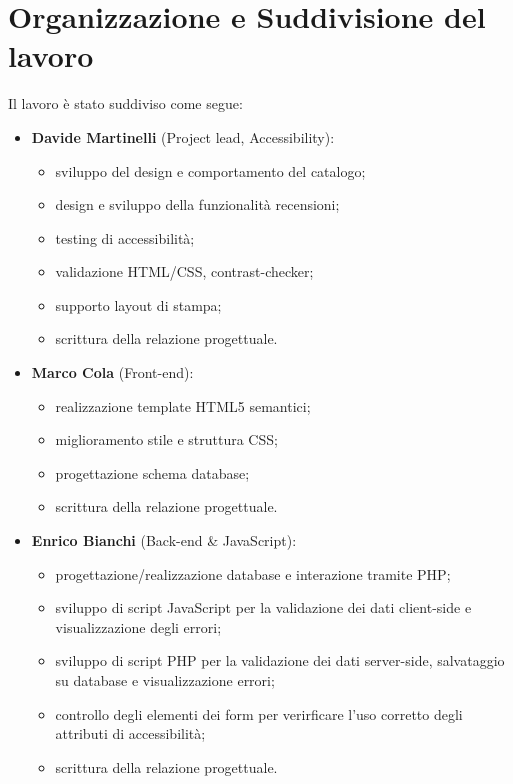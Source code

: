 \documentclass{article}
\begin{document}
\section{Organizzazione e Suddivisione del lavoro}
Il lavoro è stato suddiviso come segue:
\begin{itemize}
    \item \textbf{Davide Martinelli} (Project lead, Accessibility):
            \begin{itemize}
                \item sviluppo del design e comportamento del catalogo;
                \item design e sviluppo della funzionalità recensioni;
                \item testing di accessibilità;
                \item validazione HTML/CSS, contrast-checker;
                \item supporto layout di stampa;
                \item scrittura della relazione progettuale.
            \end{itemize}
    \item \textbf{Marco Cola} (Front-end):
            \begin{itemize}
                \item realizzazione template HTML5 semantici;
                \item miglioramento stile e struttura CSS;
                \item progettazione schema database;
                \item scrittura della relazione progettuale.
            \end{itemize}
    \item \textbf{Enrico Bianchi} (Back-end \& JavaScript):
            \begin{itemize}
                \item progettazione/realizzazione database e interazione tramite PHP;
                \item sviluppo di script JavaScript per la validazione dei dati client-side e visualizzazione degli errori;
                \item sviluppo di script PHP per la validazione dei dati server-side, salvataggio su database e visualizzazione errori;
                \item controllo degli elementi dei form per verirficare l’uso corretto degli attributi di accessibilità;
                \item scrittura della relazione progettuale.

\end{itemize}
\end{itemize}
\end{document}
